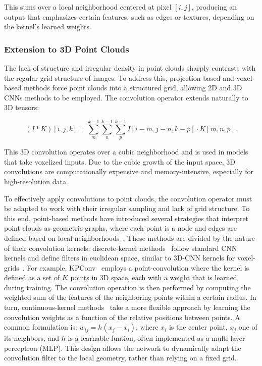 This sums over a local neighborhood centered at pixel $[i, j]$, producing an
output that emphasizes certain features, such as edges or textures, depending
on the kernel's learned weights.

\subsubsection{Extension to 3D Point Clouds}

The lack of structure and irregular density in point clouds sharply contrasts
with the regular grid structure of images.
%
To address this, projection-based and voxel-based methods force point clouds
into a structured grid, allowing 2D and 3D CNNs methods to be employed.
%
The convolution operator extends naturally to 3D tensors:

\begin{equation}\label{eq:3d-discrete-conv}
    (I * K)[i, j, k] = \sum_{m}^{k-1} \sum_{n}^{k-1} \sum_{p}^{k-1} I[i - m, j - n, k - p] \cdot K[m,n,p].
\end{equation}

This 3D convolution operates over a cubic neighborhood and is used in models
that take voxelized inputs. Due to the cubic growth of the input space, 3D
convolutions are computationally expensive and memory-intensive, especially for
high-resolution data.
%

To effectively apply convolutions to point clouds, the convolution operator
must be adapted to work with their irregular sampling and lack of grid
structure.
%
To this end, point-based methods have introduced several strategies that
interpret point clouds as geometric graphs, where each point is a node and
edges are defined based on local
neighborhoods~\cite{hermosilla2018monte,simonovsky2017dynamic}.
%
These methods are divided by the nature of their convolution kernels:
%
discrete-kernel
methods~\cite{lei2019octree,thomas2019kpconv,lei2020spherical,zhu2021cylindrical,wang2019graph}
follow standard CNN kernels and define filters in euclidean space, similar to
3D-CNN kernels for voxel-grids~\cite{maturana2015voxnet}.
%
For example, KPConv~\cite{thomas2019kpconv} employs a point-convolution where
the kernel is defined as a set of $K$ points in 3D space, each with a weight
that is learned during training. The convolution operation is then performed by
computing the weighted sum of the features of the neighboring points within a
certain radius.
%
In turn, continuous-kernel
methods~\cite{groh2018flex,wang2018deep,xu2018spidercnn,li2018pointcnn,wu2019pointconv}
take a more flexible approach by learning the convolution weights as a function
of the relative positions between points. A common formulation is: $w_{ij} =
    h(x_j - x_i)$, where $x_i$ is the center point, $x_j$ one of its neighbors, and
$h$ is a learnable funtion, often implemented as a multi-layer perceptron
(MLP).
%
This design allows the network to dynamically adapt the convolution filter to
the local geometry, rather than relying on a fixed grid.
%

